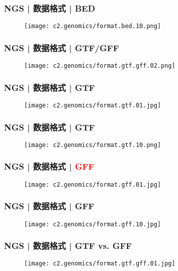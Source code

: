 \begin{frame}
  \frametitle{NGS | 数据格式 | BED}
  \begin{figure}
    \centering
    \texttt{[image: c2.genomics/format.bed.10.png]}
  \end{figure}
\end{frame}

\begin{frame}
  \frametitle{NGS | 数据格式 | GTF/GFF}
  \begin{figure}
    \centering
    \texttt{[image: c2.genomics/format.gtf.gff.02.png]}
  \end{figure}
\end{frame}

\begin{frame}
  \frametitle{NGS | 数据格式 | GTF}
  \begin{figure}
    \centering
    \texttt{[image: c2.genomics/format.gtf.01.jpg]}
  \end{figure}
\end{frame}

\begin{frame}
  \frametitle{NGS | 数据格式 | GTF}
  \begin{figure}
    \centering
    \texttt{[image: c2.genomics/format.gtf.10.png]}
  \end{figure}
\end{frame}

\begin{frame}
  \frametitle{NGS | 数据格式 | \textcolor{red}{GFF}}
  \begin{figure}
    \centering
    \texttt{[image: c2.genomics/format.gff.01.jpg]}
  \end{figure}
\end{frame}

\begin{frame}
  \frametitle{NGS | 数据格式 | GFF}
  \begin{figure}
    \centering
    \texttt{[image: c2.genomics/format.gff.10.jpg]}
  \end{figure}
\end{frame}

\begin{frame}
  \frametitle{NGS | 数据格式 | GTF vs. GFF}
  \begin{figure}
    \centering
    \texttt{[image: c2.genomics/format.gtf.gff.01.jpg]}
  \end{figure}
\end{frame}

